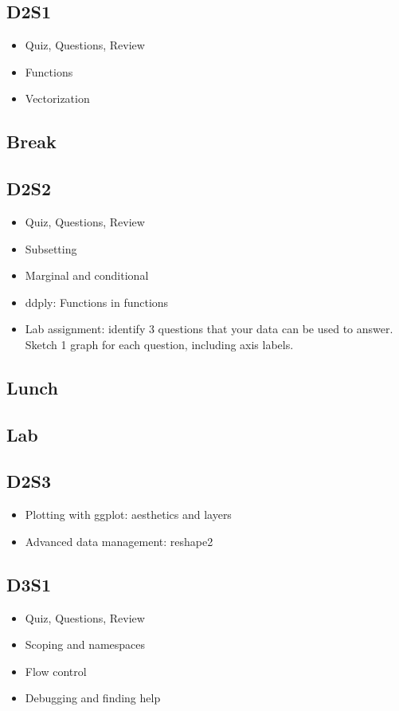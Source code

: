\documentclass[english, letterpaper, 12pt]{article}
\begin{document}
\clearpage
\subsection*{D2S1}
\begin{itemize}
    \item Quiz, Questions, Review
    \item Functions
    \item Vectorization
\end{itemize}
\subsection*{Break}
\subsection*{D2S2}
\begin{itemize}
    \item Quiz, Questions, Review
    \item Subsetting
    \item Marginal and conditional
    \item ddply: Functions in functions 
    \item Lab assignment: identify 3 questions that your data can be used to answer.
Sketch 1 graph for each question, including axis labels.
\end{itemize}
\subsection*{Lunch}
\subsection*{Lab}
\subsection*{D2S3}
\begin{itemize}
    \item Plotting with ggplot: aesthetics and layers
    \item Advanced data management: reshape2
\end{itemize}

\clearpage
\subsection*{D3S1}
\begin{itemize}
    \item Quiz, Questions, Review
    \item Scoping and namespaces
    \item Flow control
    \item Debugging and finding help
\end{itemize}
\end{document}
